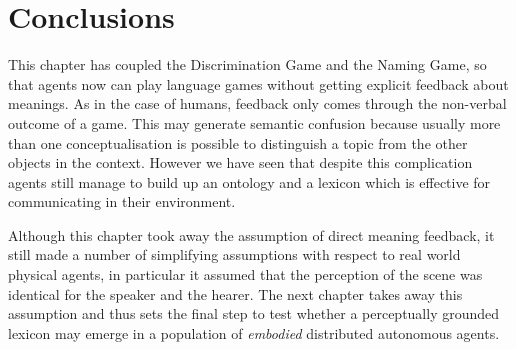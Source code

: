 \section{Conclusions}

This chapter has coupled the Discrimination Game and 
the Naming Game, so that agents now can play language
games without getting explicit feedback about meanings. 
As in the case of humans, feedback only comes through 
the non-verbal outcome of a game. 
This may generate semantic confusion
because usually more than one conceptualisation is 
possible to distinguish a topic from the other objects
in the context. However we have seen that despite
this complication agents still manage to build up 
an ontology and a lexicon which is effective for 
communicating in their environment. 

Although this chapter took away the assumption of 
direct meaning feedback, it still made a number of 
simplifying assumptions with respect to real world
physical agents, in particular it assumed that 
the perception of the scene was identical for
the speaker and the hearer. The next chapter takes away 
this assumption and thus sets the final step to test 
whether a perceptually grounded lexicon may 
emerge in a population of {\it embodied} distributed 
autonomous agents. 

